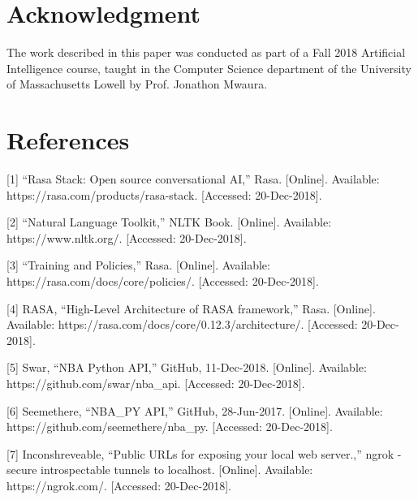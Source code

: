 \documentclass[conference]{IEEEtran}
\begin{document}
\section*{Acknowledgment}
The work described in this paper was conducted as part of a Fall 2018 Artificial Intelligence course, taught in the Computer Science department of the University of Massachusetts Lowell by Prof. Jonathon Mwaura.


\section*{References}
[1] 	“Rasa Stack: Open source conversational AI,” Rasa. [Online]. Available: https://rasa.com/products/rasa-stack. [Accessed: 20-Dec-2018].

[2] 	“Natural Language Toolkit,” NLTK Book. [Online]. Available: https://www.nltk.org/. [Accessed: 20-Dec-2018].

[3] 	“Training and Policies,” Rasa. [Online]. Available: https://rasa.com/docs/core/policies/. [Accessed: 20-Dec-2018].

[4] 	RASA, “High-Level Architecture of RASA framework,” Rasa. [Online]. Available: https://rasa.com/docs/core/0.12.3/architecture/. [Accessed: 20-Dec-2018].

[5] 	Swar, “NBA Python API,” GitHub, 11-Dec-2018. [Online]. Available: https://github.com/swar/nba\_api. [Accessed: 20-Dec-2018].

[6]	Seemethere, “NBA\_PY API,” GitHub, 28-Jun-2017. [Online]. Available: https://github.com/seemethere/nba\_py. [Accessed: 20-Dec-2018].

[7]	Inconshreveable, “Public URLs for exposing your local web server.,” ngrok - secure introspectable tunnels to localhost. [Online]. Available: https://ngrok.com/. 		   [Accessed: 20-Dec-2018].
\end{document}

